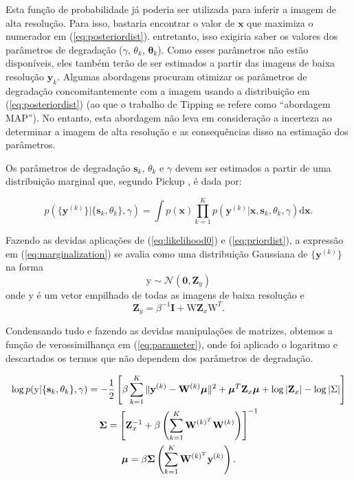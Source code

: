 Esta função de probabilidade já poderia ser utilizada para inferir a imagem de alta resolução.
Para isso, bastaria encontrar o valor de $\mathbf{x}$ que maximiza o numerador em (\ref{eq:posteriordist}). entretanto, isso exigiria saber os valores dos parâmetros de degradação ($\gamma$, $\theta_k$, $\mathbf{\theta}_k$).
Como esses parâmetros não estão disponíveis, eles também terão de ser estimados a partir das imagens de baixa resolução $\mathbf{y}_k$. 
Algumas abordagens procuram otimizar os parâmetros de degradação concomitantemente com a imagem usando a distribuição em (\ref{eq:posteriordist}) (ao que o trabalho de Tipping \cite{tipping2003bayesian} se refere como ``abordagem MAP''). No entanto, esta abordagem não leva em consideração a incerteza ao determinar a imagem de alta resolução e as consequências disso na estimação dos parâmetros.

Os parâmetros de degradação $\mathbf{s}_k$, $\theta_k$ e $\gamma$ devem ser estimados a partir de uma distribuição marginal que, segundo Pickup \cite{pickup2007bayesian2}, é dada por:

\begin{equation}
	\label{eq:marginalization}
	p(\{\mathbf{y}^{(k)}\} | \{\mathbf{s}_k, \theta_k \}, \gamma) = 
	\int  p(\mathbf{x})\prod^K_{k=1} p(\mathbf{y}^{(k)}|\mathbf{x},\mathbf{s}_k,\theta_k, \gamma) \mathrm{d}\mathbf{x}.
\end{equation}

Fazendo as devidas aplicações de (\ref{eq:likelihood0}) e (\ref{eq:priordist}), a expressão em (\ref{eq:marginalization}) se avalia como uma distribuição Gaussiana de $\{\mathbf{y}^{(k)}\}$ na forma
\begin{equation}
	\mathrm{y} \sim \mathcal{N}(\mathbf{0}, \mathbf{Z}_y)
\end{equation}
onde $\mathrm{y}$ é um vetor empilhado de todas as imagens de baixa resolução e
\begin{equation}
	\mathbf{Z}_y = \beta^{-1} \mathbf{I} + \mathrm{W} \mathbf{Z}_x \mathrm{W}^T.
\end{equation}


Condensando tudo e fazendo as devidas manipulações de matrizes, obtemos a função de verossimilhança em (\ref{eq:parameter}), onde foi aplicado o logaritmo e descartados os termos que não dependem dos parâmetros de degradação.

\begin{gather}
	\label{eq:parameter}
	\log p(\mathrm{y}|\{\mathbf{s}_k,\theta_k\}, \gamma) = -\frac{1}{2}\left[\beta \sum^K_{k=1} \|\mathbf{y}^{(k)} - \mathbf{W}^{(k)}\boldsymbol{\mu}\|^2
    + \boldsymbol{\mu}^T\mathbf{Z}_x \boldsymbol{\mu}
    \vphantom{\int_t} + \log |\mathbf{Z}_x| - \log{|\Sigma |} \right] \\
	\mathbf{ \Sigma }= \left[\mathbf{Z}^{-1}_x + \beta \left( \sum^K_{k = 1} \mathbf{W}^{(k)^T} \mathbf{W}^{(k)} \right) \right]^{-1} \\
	\boldsymbol{\mu} = \beta \mathbf{ \Sigma } \left( \sum^K_{k=1} \mathbf{W}^{(k)^T}\mathbf{y}^{(k)} \right).
\end{gather}

